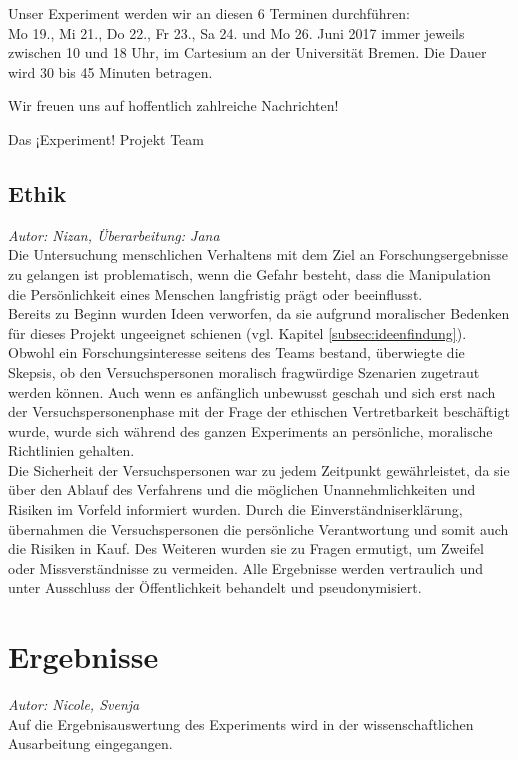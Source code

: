 \documentclass{Bericht}
\begin{document}
Unser Experiment werden wir an diesen 6 Terminen durchführen: \\

Mo 19., Mi 21., Do 22., Fr 23., Sa 24. und Mo 26. Juni 2017 immer jeweils zwischen 10 und 18 Uhr, im Cartesium an der Universität Bremen. Die Dauer wird 30 bis 45 Minuten betragen.

Wir freuen uns auf hoffentlich zahlreiche Nachrichten!

Das ¡Experiment! Projekt Team
\par 
\endgroup


\subsection{Ethik}
\textit{Autor: Nizan, Überarbeitung: Jana}\\
Die Untersuchung menschlichen Verhaltens mit dem Ziel an Forschungsergebnisse zu gelangen ist problematisch, wenn die Gefahr besteht, dass die Manipulation die Persönlichkeit eines Menschen langfristig prägt oder beeinflusst.\\
Bereits zu Beginn wurden Ideen verworfen, da sie aufgrund moralischer Bedenken für dieses Projekt ungeeignet schienen (vgl. Kapitel \ref{subsec:ideenfindung}). Obwohl ein Forschungsinteresse seitens des Teams bestand, überwiegte die Skepsis, ob den Versuchspersonen moralisch fragwürdige Szenarien zugetraut werden können. Auch wenn es anfänglich unbewusst geschah und sich erst nach der Versuchspersonenphase mit der Frage der ethischen Vertretbarkeit beschäftigt wurde, wurde sich während des ganzen Experiments an persönliche, moralische Richtlinien gehalten. \\
Die Sicherheit der Versuchspersonen war zu jedem Zeitpunkt gewährleistet, da sie über den Ablauf des Verfahrens und die möglichen Unannehmlichkeiten und Risiken im Vorfeld informiert wurden. Durch die Einverständniserklärung, übernahmen die Versuchspersonen die persönliche Verantwortung und somit auch die Risiken in Kauf. Des Weiteren wurden sie zu Fragen ermutigt, um Zweifel oder Missverständnisse zu vermeiden. Alle Ergebnisse werden vertraulich und unter Ausschluss der Öffentlichkeit behandelt und pseudonymisiert.

\section{Ergebnisse}
\textit{Autor: Nicole, Svenja}\\
Auf die Ergebnisauswertung des Experiments wird in der wissenschaftlichen Ausarbeitung eingegangen.
\end{document}
